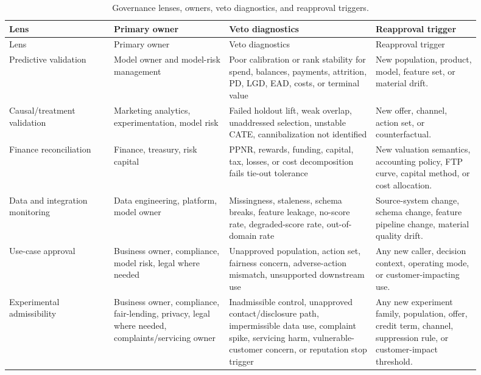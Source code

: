 \documentclass[11pt]{article}
\newcommand{\1}{\mathbf{1}}
\begin{document}
\begin{longtable}{L{0.20\linewidth}L{0.22\linewidth}L{0.28\linewidth}L{0.20\linewidth}}
\caption{Governance lenses, owners, veto diagnostics, and reapproval triggers.}
\label{tab:governance}\\
\toprule
Lens & Primary owner & Veto diagnostics & Reapproval trigger \\
\midrule
\endfirsthead
\toprule
Lens & Primary owner & Veto diagnostics & Reapproval trigger \\
\midrule
\endhead
Predictive validation
  & Model owner and model-risk management
  & Poor calibration or rank stability for spend, balances, payments,
    attrition, PD, LGD, EAD, costs, or terminal value
  & New population, product, model, feature set, or material drift. \\
Causal/treatment validation
  & Marketing analytics, experimentation, model risk
  & Failed holdout lift, weak overlap, unaddressed selection, unstable CATE,
    cannibalization not identified
  & New offer, channel, action set, or counterfactual. \\
Finance reconciliation
  & Finance, treasury, risk capital
  & PPNR, rewards, funding, capital, tax, losses, or cost decomposition fails
    tie-out tolerance
  & New valuation semantics, accounting policy, FTP curve, capital method, or
    cost allocation. \\
Data and integration monitoring
  & Data engineering, platform, model owner
  & Missingness, staleness, schema breaks, feature leakage, no-score rate,
    degraded-score rate, out-of-domain rate
  & Source-system change, schema change, feature pipeline change, material
    quality drift. \\
Use-case approval
  & Business owner, compliance, model risk, legal where needed
  & Unapproved population, action set, fairness concern, adverse-action
    mismatch, unsupported downstream use
  & Any new caller, decision context, operating mode, or customer-impacting
    use. \\
Experimental admissibility
  & Business owner, compliance, fair-lending, privacy, legal where needed,
    complaints/servicing owner
  & Inadmissible control, unapproved contact/disclosure path, impermissible
    data use, complaint spike, servicing harm, vulnerable-customer concern, or
    reputation stop trigger
  & Any new experiment family, population, offer, credit term, channel,
    suppression rule, or customer-impact threshold. \\
\bottomrule
\end{longtable}
\end{document}
